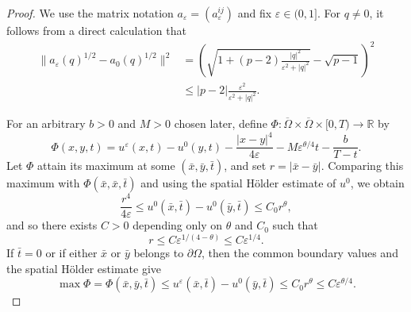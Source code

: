 \documentclass[a4paper,11pt]{amsart}
\theoremstyle{plain}
\theoremstyle{definition}
\numberwithin{equation}{section}
\begin{document}
\begin{proof}
We use the matrix notation $a_\varepsilon=(a_\varepsilon^{ij})$
and fix $\varepsilon\in(0,1]$. For $q \neq 0$, it follows from a direct calculation that
\begin{equation*}
\begin{aligned}
\|a_\varepsilon(q)^{1/2}-a_0(q)^{1/2}\|^2
&=\left(\sqrt{1+(p-2)\frac{|q|^2}{\varepsilon^2+|q|^2}}-\sqrt{p-1}\right)^2\\
&\leq |p-2|\frac{\varepsilon^2}{\varepsilon^2+|q|^2}.
\end{aligned}
\end{equation*}

For an arbitrary $b>0$ and $M>0$ chosen later, define $\Phi: \overline\Omega\times\overline\Omega\times[0,T) \to \mathbb{R}$ by
\begin{equation*}
\Phi(x,y,t)=u^\varepsilon(x,t)-u^0(y,t)-\frac{|x-y|^4}{4\varepsilon}-M\varepsilon^{\theta/4}t-\frac{b}{T-t}.
\end{equation*}
Let $\Phi$ attain its maximum at some $(\bar x,\bar y,\bar t)$, and set $r=|\bar x-\bar y|$. Comparing this maximum with $\Phi(\bar x,\bar x,\bar t)$
and using the spatial H\"older estimate of $u^0$, we obtain
\begin{equation*}
\frac{r^4}{4\varepsilon}
\leq u^0(\bar x,\bar t)-u^0(\bar y,\bar t)\leq C_0r^\theta,
\end{equation*}
and so there exists $C>0$ depending only on $\theta$ and $C_0$ such that
\begin{equation*}
r\leq C\varepsilon^{1/(4-\theta)}
\leq C\varepsilon^{1/4}.
\end{equation*}
If $\bar t=0$ or if either $\bar x$ or $\bar y$ belongs to $\partial\Omega$, then the common boundary values and the spatial H\"older estimate give
\begin{equation*}
\max \Phi=\Phi(\bar x, \bar y, \bar t) \leq u^\varepsilon(\bar x,\bar t)-u^0(\bar y,\bar t) \leq C_0r^\theta \leq C\varepsilon^{\theta/4}.
\end{equation*}


\end{proof}
\end{document}
